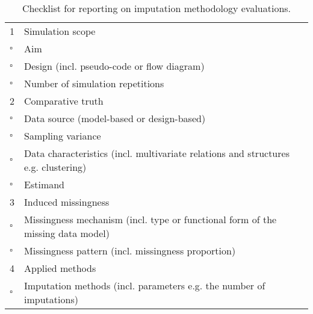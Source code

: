 \documentclass[bimj,fleqn]{w-art}
\begin{document}
\begin{table}[ht]
\caption{Checklist for reporting on imputation methodology evaluations.}
\label{table:check}
\begin{tabular}{ll}
\hline
1 & Simulation scope                                                                   \\ \cline{2-2}
$\square$  & Aim                                                                                \\
$\square$  & Design (incl. pseudo-code or flow diagram)                                         \\
$\square$  & Number of simulation repetitions                                                   \\ \hline
2 & Comparative truth                                                                  \\ \cline{2-2}
$\square$  & Data source (model-based or design-based)                                           \\
$\square$  & Sampling variance                                                                  \\
$\square$  & Data characteristics (incl. multivariate relations and structures e.g. clustering) \\
$\square$  & Estimand                                                                           \\ \hline 
3 & Induced missingness                                                                \\ \cline{2-2}
$\square$  & Missingness mechanism (incl. type or functional form of the missing data   model)  \\
$\square$  & Missingness pattern (incl. missingness proportion)                                 \\ \hline 
4 & Applied methods                                                                    \\ \cline{2-2}
$\square$  & Imputation methods (incl. parameters e.g. the number of imputations)               \\

\end{tabular}
\end{table}
\end{document}
